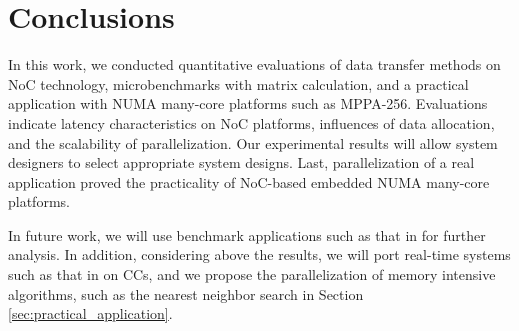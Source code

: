\chapter{Conclusions}
\label{sec:conclusion}
In this work, we conducted quantitative evaluations of data transfer methods on NoC technology, microbenchmarks with matrix calculation, and a practical application with NUMA many-core platforms such as MPPA-256.
Evaluations indicate latency characteristics on NoC platforms, influences of data allocation, and the scalability of parallelization.
Our experimental results will allow system designers to select appropriate system designs.
Last, parallelization of a real application proved the practicality of NoC-based embedded NUMA many-core platforms.

In future work, we will use benchmark applications such as that in \cite{che2010characterization} for further analysis.
In addition, considering above the results, we will port real-time systems such as that in \cite{maruyama2016ros2} on CCs, and we propose the parallelization of memory intensive algorithms, such as the nearest neighbor search in Section \ref{sec:practical_application}.







% 
% 

% 

